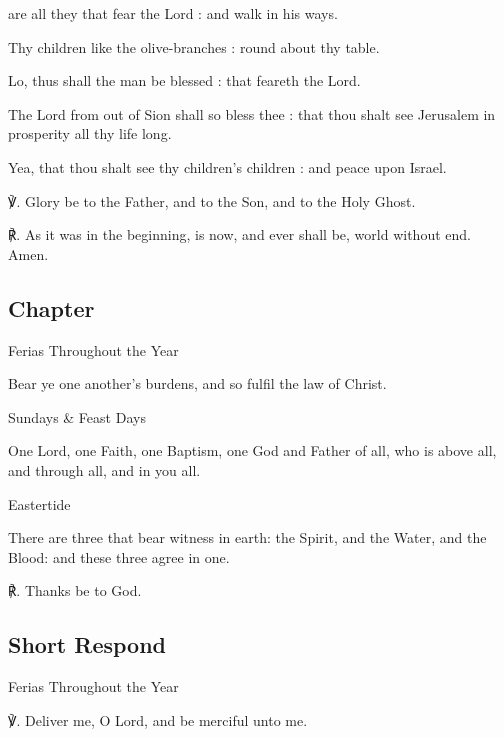 \begin{multicols}{2}
 are all they that fear the Lord : and walk in his ways.\par
{}
Thy children like the olive-branches : round about thy table.\par
{}Lo, thus shall the man be blessed : that feareth the Lord.\par
{}The Lord from out of Sion shall so bless thee : that thou shalt see Jerusalem in prosperity all thy life long.\par
{}Yea, that thou shalt see thy children's children : and peace upon Israel.\par
℣. Glory be to the Father, and to the Son, and to the Holy Ghost.\par
℟. As it was in the beginning, is now, and ever shall be, world without end. Amen.

\subsection{Chapter}
\begin{inhead}
	Ferias Throughout the Year
\end{inhead}\par\noindent
Bear ye one another's burdens, and so fulfil the law of Christ.

\begin{inhead}
	Sundays \& Feast Days
\end{inhead}\par\noindent
One Lord, one Faith, one Baptism, one God and Father of all, who is above all, and through all, and in you all.

\begin{inhead}
	Eastertide
\end{inhead}\par\noindent
There are three that bear witness in earth: the Spirit, and the Water, and the Blood: and these three agree in one.

℟. Thanks be to God.

\subsection{Short Respond}
\begin{inhead}
	Ferias Throughout the Year
\end{inhead}
℣. Deliver me, O Lord, and be merciful unto me.


\end{multicols}
